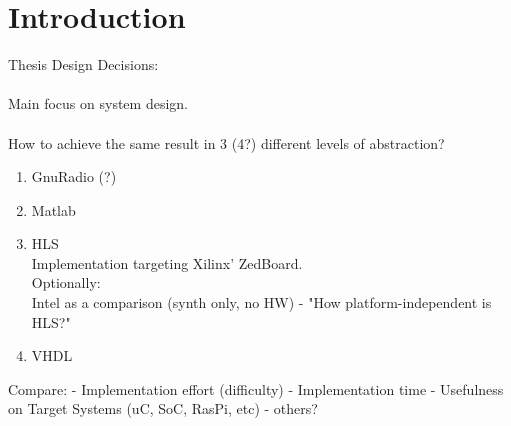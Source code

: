 \chapter{Introduction}
\label{cha:Introduction}

Thesis Design Decisions: \\
\\
Main focus on system design. \\
\\
How to achieve the same result in 3 (4?) different levels of abstraction?

\begin{enumerate}
  \item GnuRadio (?)
  \item Matlab
  \item HLS\\
      Implementation targeting Xilinx' ZedBoard.\\
      Optionally: \\
      Intel as a comparison (synth only, no HW) - "How platform-independent is HLS?"
  \item VHDL
\end{enumerate}
\vspace{.5 cm}
Compare:
- Implementation effort (difficulty)
- Implementation time
- Usefulness on Target Systems (uC, SoC, RasPi, etc)
- others?
